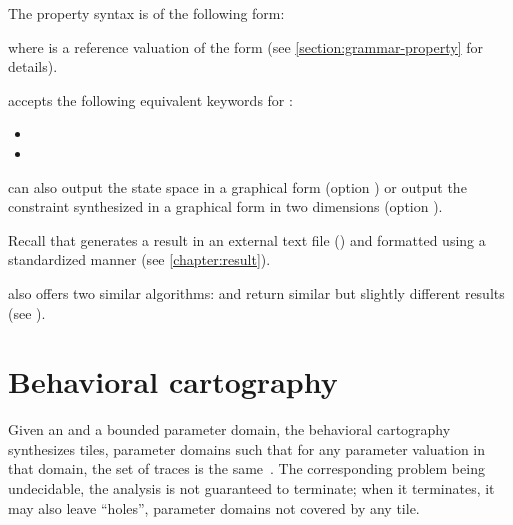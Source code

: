 The property syntax is of the following form:


\noindent{}
where  is a reference valuation of the form  (see \cref{section:grammar-property} for details).

\begin{syntaxalias}
	\imitator{} accepts the following equivalent keywords for :
	\begin{itemize}
		\item {}
		\item {}
	\end{itemize}
\end{syntaxalias}


\imitator{} can also output the state space in a graphical form (option )
or
output the constraint synthesized in a graphical form in two dimensions (option ).

Recall that \imitator{} %
generates
a result in an external text file () and formatted using a standardized manner (see \cref{chapter:result}). %


\imitator{} also offers two similar algorithms:  and  return similar but slightly different results (see \cite{AS11}).


\section{Behavioral cartography}\label{ss:mode:BC}

Given an \NIPTA{} and a bounded parameter domain, the behavioral cartography~\BC{} synthesizes tiles, \ie{} parameter domains such that for any parameter valuation in that domain, the set of traces is the same~\cite{AF10}.
The corresponding problem being undecidable, the analysis is not guaranteed to terminate; when it terminates, it may also leave ``holes'', \ie{} parameter domains not covered by any tile.

